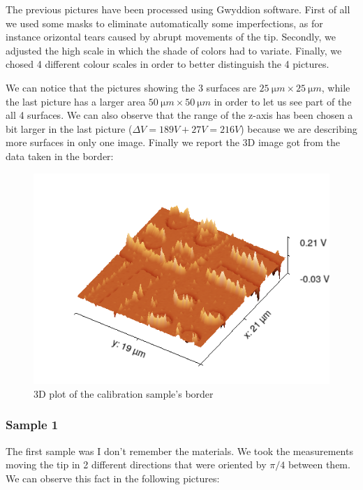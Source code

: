 \documentclass[11pt,a4paper]{article}
\begin{document}
The previous pictures have been processed using Gwyddion software. First of all we used some masks to eliminate automatically some imperfections, as for instance orizontal tears caused by abrupt movements of the tip. Secondly, we adjusted the high scale in which the shade of colors had to variate. Finally, we chosed 4 different colour scales in order to better distinguish the 4 pictures.

We can notice that the pictures showing the 3 surfaces are $\SI{25}{\micro m} \times \SI{25}{\micro m}$, while the last picture has a larger area $\SI{50}{\micro m} \times \SI{50}{\micro m}$ in order to let us see part of the all 4 surfaces. We can also observe that the range of the z-axis has been chosen a bit larger in the last picture ($\Delta V=189V+27V=216V$) {\color{red}because we are describing more surfaces in only one image.} Finally we report the 3D image got from the data taken in the border:

\begin{figure}[ht]
\centering
\includegraphics[scale=0.47]{sm_border_3D}
\caption{3D plot of the calibration sample's border}
\label{fig: cal sam border}
\end{figure}

\subsubsection{Sample 1}
The first sample was {\color{Red} I don't remember the materials}. We took the measurements moving the tip in 2 different directions that were oriented by $\pi /4$ between them. We can observe this fact in the following pictures:
\end{document}
